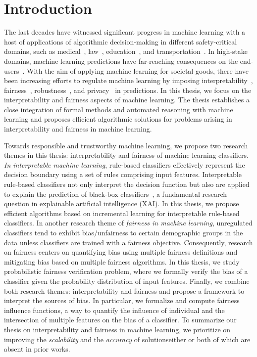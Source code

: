 \chapter{Introduction}
The last decades have witnessed significant progress in machine learning with a host of applications of algorithmic decision-making in different safety-critical domains, such as medical~\cite{erickson2017machine,kaissis2020secure,kononenko2001machine}, law~\cite{kumar2018law,surden2014machine}, education~\cite{luckin2018machine}, and transportation~\cite{peled2019model,zantalis2019review}. In high-stake domains,  machine learning predictions have far-reaching consequences on the end-users~\cite{eshete2021making}. With the aim of applying machine learning for societal goods, there have been increasing efforts to regulate machine learning by imposing interpretability~\cite{rudin2019stop}, fairness~\cite{barocas2017fairness}, robustness~\cite{rauber2017foolbox}, and privacy~\cite{papernot2016towards} in predictions. In this thesis, we focus on the interpretability and fairness aspects of machine learning. The thesis establishes a close integration of formal methods and automated reasoning with machine learning and proposes efficient algorithmic solutions for problems arising in interpretability and fairness in machine learning.

Towards responsible and trustworthy machine learning, we propose two research themes in this thesis: interpretability and fairness of machine learning classifiers. \emph{In interpretable machine learning}, rule-based classifiers effectively represent the decision boundary using a set of rules comprising input features. Interpretable rule-based classifiers not only interpret the decision function but also are applied to explain the prediction of black-box classifiers~\cite{gill2020responsible,lundberg2017unified,moradi2021post,ribeiro2016should,slack2020fooling}, a fundamental research question in explainable artificial intelligence (XAI). In this thesis, we propose efficient algorithms based on incremental learning for interpretable rule-based classifiers. In another research theme of \emph{fairness in machine learning}, unregulated classifiers tend to exhibit bias/unfairness to certain demographic groups in the data unless classifiers are trained with a fairness objective. Consequently, research on fairness centers on quantifying bias using multiple fairness definitions and mitigating bias based on multiple fairness algorithms. In this thesis, we study probabilistic fairness verification problem, where we formally verify the bias of a classifier given the probability distribution of input features. Finally, we combine both research themes: interpretability and fairness and propose a framework to interpret the sources of bias. In particular, we formalize and compute fairness influence functions, a way to quantify the influence of individual and the intersection of multiple features on the bias of a classifier. To summarize our thesis on interpretability and fairness in machine learning, we prioritize on improving the \emph{scalability} and the \emph{accuracy} of solutions\textemdash either or both of which are absent in prior works. 




